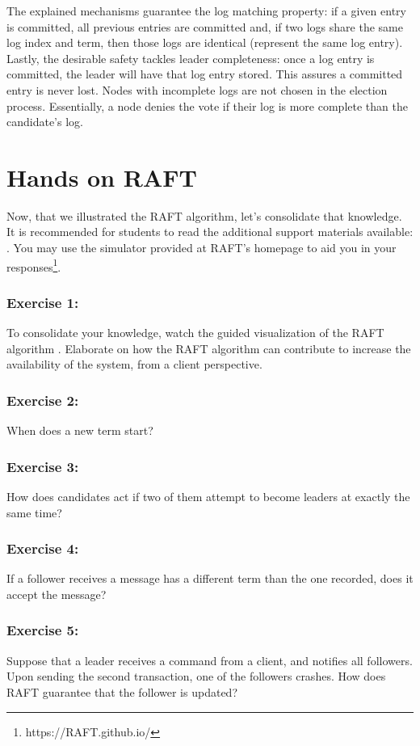 \documentclass[12pt,a4paper]{article}
\begin{document}
The explained mechanisms guarantee the log matching property: if a given entry is committed, all previous entries are committed and, if two logs share the same log index and term, then those logs are identical (represent the same log entry). Lastly, the desirable safety tackles leader completeness: once a log entry is committed, the leader will have that log entry stored. This assures a committed entry is never lost. Nodes with incomplete logs are not chosen in the election process. Essentially, a node denies the vote if their log is more complete than the candidate's log.


\section{Hands on RAFT}
Now, that we illustrated the RAFT algorithm, let's consolidate that knowledge. It is recommended for students to read the additional support materials available: \cite{raft_paper,raft_homepage}. You may use the simulator provided at RAFT's homepage to aid you in your responses\footnote{https://RAFT.github.io/}.


\subsubsection*{Exercise 1:} To consolidate your knowledge, watch the guided visualization of the RAFT algorithm \cite{raft_viz}. 
Elaborate on how the RAFT algorithm can contribute to increase the availability of the system, from a client perspective.

\subsubsection*{Exercise 2:} When does a new term start? 



\subsubsection*{Exercise 3:} How does candidates act if two of them attempt to become leaders at exactly the same time?


\subsubsection*{Exercise 4:} If a follower receives a message has a different term than the one recorded, does it accept the message?  

\subsubsection*{Exercise 5:} Suppose that a leader receives a command from a client, and notifies all followers. Upon sending the second transaction, one of the followers crashes. How does RAFT guarantee that the follower is updated?
\end{document}
